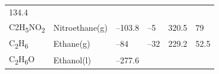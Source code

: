 \documentclass[
  9pt,
]{extbook}
\theoremstyle{definition}
\theoremstyle{definition}
\theoremstyle{definition}
\theoremstyle{remark}
\begin{document}
\begin{longtable}[]{@{}llllll@{}}
\begin{minipage}[t]{0.14\columnwidth}
134.4\strut
\end{minipage}\tabularnewline
\begin{minipage}[t]{0.07\columnwidth}\raggedright
C2H\textsubscript{5}NO\textsubscript{2}\strut
\end{minipage} & \begin{minipage}[t]{0.17\columnwidth}\raggedright
Nitroethane(g)\strut
\end{minipage} & \begin{minipage}[t]{0.15\columnwidth}\raggedright
--103.8\strut
\end{minipage} & \begin{minipage}[t]{0.15\columnwidth}\raggedright
--5\strut
\end{minipage} & \begin{minipage}[t]{0.14\columnwidth}\raggedright
320.5\strut
\end{minipage} & \begin{minipage}[t]{0.14\columnwidth}\raggedright
79\strut
\end{minipage}\tabularnewline
\begin{minipage}[t]{0.07\columnwidth}\raggedright
C\textsubscript{2}H\textsubscript{6}\strut
\end{minipage} & \begin{minipage}[t]{0.17\columnwidth}\raggedright
Ethane(g)\strut
\end{minipage} & \begin{minipage}[t]{0.15\columnwidth}\raggedright
--84\strut
\end{minipage} & \begin{minipage}[t]{0.15\columnwidth}\raggedright
--32\strut
\end{minipage} & \begin{minipage}[t]{0.14\columnwidth}\raggedright
229.2\strut
\end{minipage} & \begin{minipage}[t]{0.14\columnwidth}\raggedright
52.5\strut
\end{minipage}\tabularnewline
\begin{minipage}[t]{0.07\columnwidth}\raggedright
C\textsubscript{2}H\textsubscript{6}O\strut
\end{minipage} & \begin{minipage}[t]{0.17\columnwidth}\raggedright
Ethanol(l)\strut
\end{minipage} & \begin{minipage}[t]{0.15\columnwidth}\raggedright
--277.6\strut
\end{minipage} & \begin{minipage}[t]{0.15\columnwidth}\raggedright

\end{minipage}
\end{longtable}
\end{document}
